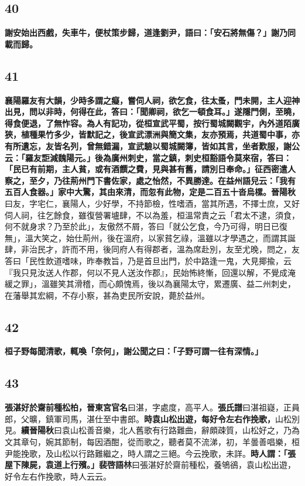 \subsection*{40}

\textbf{謝安始出西戲，失車牛，便杖策步歸，道逢劉尹，語曰：「安石將無傷？」謝乃同載而歸。}

\subsection*{41}

\textbf{襄陽羅友有大韻，少時多謂之癡，嘗伺人祠，欲乞食，往太蚤，門未開，主人迎神出見，問以非時，何得在此，答曰：「聞卿祠，欲乞一頓食耳。」遂隱門側，至曉，得食便退，了無怍容。為人有記功，從桓宣武平蜀，按行蜀城闕觀宇，內外道陌廣狹，植種果竹多少，皆默記之，後宣武漂洲與簡文集，友亦預焉，共道蜀中事，亦有所遺忘，友皆名列，曾無錯漏，宣武驗以蜀城闕簿，皆如其言，坐者歎服，謝公云：「羅友詎減魏陽元。」後為廣州刺史，當之鎮，刺史桓豁語令莫來宿，答曰：「民已有前期，主人貧，或有酒饌之費，見與甚有舊，請別日奉命。」征西密遣人察之，至夕，乃往荊州門下書佐家，處之怡然，不異勝達。在益州語兒云：「我有五百人食器。」家中大驚，其由來清，而忽有此物，定是二百五十沓烏樏。}{\footnotesize \textbf{晉陽秋}曰友，字宅仁，襄陽人，少好學，不持節檢，性嗜酒，當其所遇，不擇士庶，又好伺人祠，往乞餘食，雖復營署壚肆，不以為羞，桓溫常責之云「君太不逮，須食，何不就身求？乃至於此」，友傲然不屑，答曰「就公乞食，今乃可得，明日已復無」，溫大笑之，始仕荊州，後在溫府，以家貧乞祿，溫雖以才學遇之，而謂其誕肆，非治民才，許而不用，後同府人有得郡者，溫為席赴別，友至尤晚，問之，友答曰「民性飲道嗜味，昨奉教旨，乃是首旦出門，於中路逢一鬼，大見揶揄，云『我只見汝送人作郡，何以不見人送汝作郡』，民始怖終慚，回還以解，不覺成淹緩之罪」，溫雖笑其滑稽，而心頗愧焉，後以為襄陽太守，累遷廣、益二州刺史，在藩舉其宏綱，不存小察，甚為吏民所安說，薨於益州。}

\subsection*{42}

\textbf{桓子野每聞清歌，輒喚「奈何」，謝公聞之曰：「子野可謂一往有深情。」}

\subsection*{43}

\textbf{張湛好於齋前種松柏，}{\footnotesize \textbf{晉東宮官名}曰湛，字處度，高平人。\textbf{張氏譜}曰湛祖嶷，正員郎，父曠，鎮軍司馬，湛仕至中書郎。}\textbf{時袁山松出遊，每好令左右作挽歌，}{\footnotesize 山松別見。\textbf{續晉陽秋}曰袁山松善音樂，北人舊歌有行路難曲，辭頗疎質，山松好之，乃為文其章句，婉其節制，每因酒酣，從而歌之，聽者莫不流涕，初，羊曇善唱樂，桓尹能挽歌，及山松以行路難繼之，時人謂之三絕。今云挽歌，未詳。}\textbf{時人謂：「張屋下陳屍，袁道上行殯。」}{\footnotesize \textbf{裴啓語林}曰張湛好於齋前種松，養鴝鵒，袁山松出遊，好令左右作挽歌，時人云云。}

